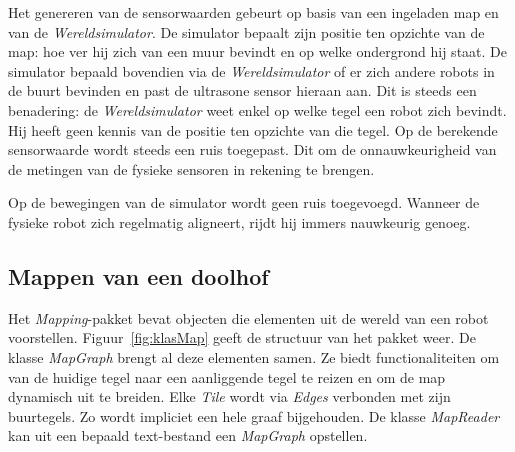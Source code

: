 \documentclass[eind]{penoverslag}
\begin{document}
Het genereren van de sensorwaarden gebeurt op basis van een ingeladen map en van de \textit{Wereldsimulator}. De simulator bepaalt zijn positie ten opzichte van de map: hoe ver hij zich van een muur bevindt en op welke ondergrond hij staat. De simulator bepaald bovendien via de \textit{Wereldsimulator} of er zich andere robots in de buurt bevinden en past de ultrasone sensor hieraan aan. Dit is steeds een benadering: de \textit{Wereldsimulator} weet enkel op welke tegel een robot zich bevindt. Hij heeft geen kennis van de positie ten opzichte van die tegel. Op de berekende sensorwaarde wordt steeds een ruis toegepast. Dit om de onnauwkeurigheid van de metingen van de fysieke sensoren in rekening te brengen.


Op de bewegingen van de simulator wordt geen ruis toegevoegd.
Wanneer de fysieke robot zich regelmatig aligneert,
rijdt hij immers nauwkeurig genoeg.


\subsection{Mappen van een doolhof}
\label{ssec:Mapping}
Het \textit{Mapping}-pakket bevat objecten die elementen uit de wereld van een robot voorstellen. Figuur~\ref{fig:klasMap} geeft de structuur van het pakket weer. De klasse \textit{MapGraph} brengt al deze elementen samen. Ze biedt functionaliteiten om van de huidige tegel naar een aanliggende tegel te reizen en om de map dynamisch uit te breiden. Elke \textit{Tile} wordt via \textit{Edges} verbonden met zijn buurtegels. Zo wordt impliciet een hele graaf bijgehouden. De klasse \textit{MapReader} kan uit een bepaald text-bestand een \textit{MapGraph} opstellen.\\
\end{document}
